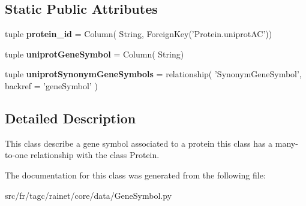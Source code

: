 \subsection*{Static Public Attributes}
\begin{DoxyCompactItemize}
\item 
\hypertarget{classsrc_1_1fr_1_1tagc_1_1rainet_1_1core_1_1data_1_1GeneSymbol_1_1GeneSymbol_ad9748883488bebb33beb35ab9471f795}{tuple {\bfseries protein\-\_\-id} = Column( String, Foreign\-Key('Protein.\-uniprot\-A\-C'))}\label{classsrc_1_1fr_1_1tagc_1_1rainet_1_1core_1_1data_1_1GeneSymbol_1_1GeneSymbol_ad9748883488bebb33beb35ab9471f795}

\item 
\hypertarget{classsrc_1_1fr_1_1tagc_1_1rainet_1_1core_1_1data_1_1GeneSymbol_1_1GeneSymbol_aa77854e15fce296866c9b787b1c8c0bd}{tuple {\bfseries uniprot\-Gene\-Symbol} = Column( String)}\label{classsrc_1_1fr_1_1tagc_1_1rainet_1_1core_1_1data_1_1GeneSymbol_1_1GeneSymbol_aa77854e15fce296866c9b787b1c8c0bd}

\item 
\hypertarget{classsrc_1_1fr_1_1tagc_1_1rainet_1_1core_1_1data_1_1GeneSymbol_1_1GeneSymbol_a7d824769d94ed91633de9c4631f93fe0}{tuple {\bfseries uniprot\-Synonym\-Gene\-Symbols} = relationship( 'Synonym\-Gene\-Symbol', backref = 'gene\-Symbol' )}\label{classsrc_1_1fr_1_1tagc_1_1rainet_1_1core_1_1data_1_1GeneSymbol_1_1GeneSymbol_a7d824769d94ed91633de9c4631f93fe0}

\end{DoxyCompactItemize}


\subsection{Detailed Description}
This class describe a gene symbol associated to a protein this class has a many-\/to-\/one relationship with the class Protein. 

The documentation for this class was generated from the following file\-:\begin{DoxyCompactItemize}
\item 
src/fr/tagc/rainet/core/data/Gene\-Symbol.\-py\end{DoxyCompactItemize}
